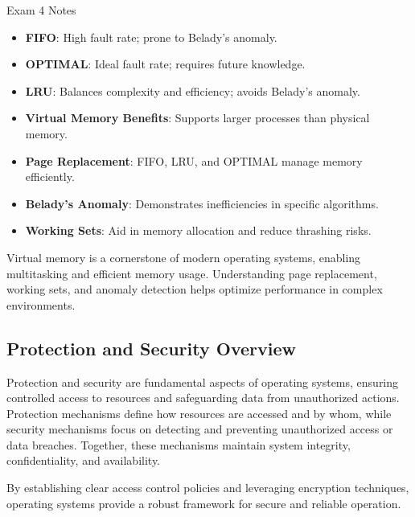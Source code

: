 \begin{examnotes}{Exam 4 Notes}
    \begin{highlight}
        \begin{itemize}
            \item \textbf{FIFO}: High fault rate; prone to Belady's anomaly.
            \item \textbf{OPTIMAL}: Ideal fault rate; requires future knowledge.
            \item \textbf{LRU}: Balances complexity and efficiency; avoids Belady's anomaly.
        \end{itemize}
    \end{highlight}
    
    \begin{highlight}
        \begin{itemize}
            \item \textbf{Virtual Memory Benefits}: Supports larger processes than physical memory.
            \item \textbf{Page Replacement}: FIFO, LRU, and OPTIMAL manage memory efficiently.
            \item \textbf{Belady's Anomaly}: Demonstrates inefficiencies in specific algorithms.
            \item \textbf{Working Sets}: Aid in memory allocation and reduce thrashing risks.
        \end{itemize}
    \end{highlight}
    
    Virtual memory is a cornerstone of modern operating systems, enabling multitasking and efficient memory usage. Understanding page replacement, working sets, and anomaly detection helps optimize performance 
    in complex environments.

    \subsection*{Protection and Security Overview}

    Protection and security are fundamental aspects of operating systems, ensuring controlled access to resources and safeguarding data from unauthorized actions. Protection mechanisms define how resources 
    are accessed and by whom, while security mechanisms focus on detecting and preventing unauthorized access or data breaches. Together, these mechanisms maintain system integrity, confidentiality, and availability.
    
    By establishing clear access control policies and leveraging encryption techniques, operating systems provide a robust framework for secure and reliable operation.
    

\end{examnotes}
